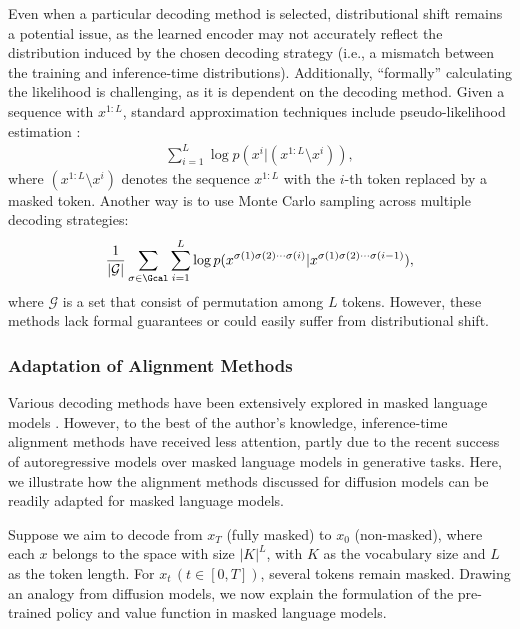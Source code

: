 {{Even when a particular decoding method is selected, distributional shift remains a potential issue, as the learned encoder may not accurately reflect the distribution induced by the chosen decoding strategy (i.e., a mismatch between the training and inference-time distributions). Additionally, ``formally'' calculating the likelihood is challenging, as it is dependent on the decoding method. Given a sequence with $x^{1:L}$, standard approximation techniques include pseudo-likelihood estimation \citep{miao2019cgmh}: 
\begin{align*}
\sum_{i=1}^L  \log p(x^{i}| (x^{1:L} \setminus x^{i}) ), 
\end{align*}
where $(x^{1:L} \setminus x^{i})$ denotes the sequence $x^{1:L}$ with the $i$-th token replaced by a masked token. Another way is to use Monte Carlo sampling across multiple decoding strategies:
{\begin{align*}
  \frac{1}{|\mathcal{G}|}\sum_{\sigma \in \Gcal} \sum_{i=1}^L \log p(x^{\sigma(1)\sigma(2)\cdots\sigma(i)}|x^{\sigma(1)\sigma(2)\cdots\sigma(i-1)}), 
\end{align*}
} 
where $\mathcal{G}$ is a set that consist of permutation among $L$ tokens. 
However, these methods lack formal guarantees or could easily suffer from distributional shift. 


\subsubsection{Adaptation of Alignment Methods}

Various decoding methods have been extensively explored in masked language models \citep{miao2019cgmh,wang2019bert}. However, to the best of the author’s knowledge, inference-time alignment methods have received less attention, partly due to the recent success of autoregressive models over masked language models in generative tasks. Here, we illustrate how the alignment methods discussed for diffusion models can be readily adapted for masked language models.


Suppose we aim to decode from $x_T$ (fully masked) to $x_0$ (non-masked), where each 
$x$ belongs to the space with size $|K|^L$, with $K$ as the vocabulary size and $L$ as the token length. For $x_t\,(t\in[0,T])$, several tokens remain masked. Drawing an analogy from diffusion models, we now explain the formulation of the pre-trained policy and value function in masked language models.


}}
